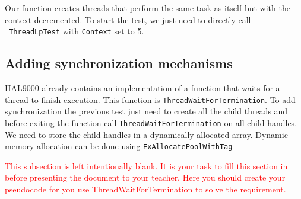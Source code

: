 \documentclass[a4paper,12pt]{report}
\begin{document}
Our function creates threads that perform the same task as itself but with the context decremented. To start the test, we just need to directly call \lstinline|_ThreadLpTest| with \lstinline|Context| set to 5. 

\subsection{Adding synchronization mechanisms}

HAL9000 already contains an implementation of a function that waits for a thread to finish execution. This function is \lstinline|ThreadWaitForTermination|. To add synchronization the previous test just need to create all the child threads and before exiting the function call \lstinline|ThreadWaitForTermination| on all child handles. We need to store the child handles in a dynamically allocated array. Dynamic memory allocation can be done using \lstinline|ExAllocatePoolWithTag|

\textcolor{red}{This subsection is left intentionally blank. It is your task to fill this section in before presenting the document to your teacher. Here you should create your pseudocode for you use ThreadWaitForTermination to solve the requirement.}
\end{document}
